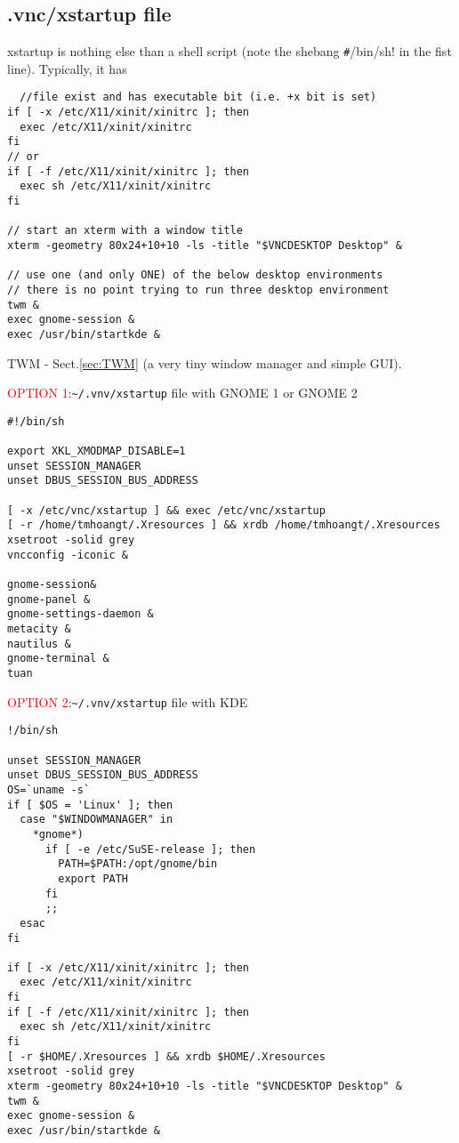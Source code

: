 \subsection{.vnc/xstartup file}
\label{sec:xstartup-vnc}

xstartup is nothing else than a shell script (note the shebang \verb!#!/bin/sh!
in the fist line). Typically, it has
\begin{verbatim} 
  //file exist and has executable bit (i.e. +x bit is set)
if [ -x /etc/X11/xinit/xinitrc ]; then
  exec /etc/X11/xinit/xinitrc
fi
// or 
if [ -f /etc/X11/xinit/xinitrc ]; then
  exec sh /etc/X11/xinit/xinitrc
fi

// start an xterm with a window title
xterm -geometry 80x24+10+10 -ls -title "$VNCDESKTOP Desktop" &

// use one (and only ONE) of the below desktop environments
// there is no point trying to run three desktop environment
twm &   
exec gnome-session &
exec /usr/bin/startkde &
\end{verbatim}
TWM - Sect.\ref{sec:TWM} (a very tiny window manager and simple GUI).

\textcolor{red}{OPTION 1}:\verb!~/.vnv/xstartup!  file with GNOME 1 or GNOME 2
\begin{verbatim}
#!/bin/sh

export XKL_XMODMAP_DISABLE=1
unset SESSION_MANAGER
unset DBUS_SESSION_BUS_ADDRESS

[ -x /etc/vnc/xstartup ] && exec /etc/vnc/xstartup
[ -r /home/tmhoangt/.Xresources ] && xrdb /home/tmhoangt/.Xresources
xsetroot -solid grey
vncconfig -iconic &

gnome-session&
gnome-panel &
gnome-settings-daemon &
metacity &
nautilus &
gnome-terminal &
tuan
\end{verbatim}


\textcolor{red}{OPTION 2}:\verb!~/.vnv/xstartup!  file with KDE
\begin{verbatim}
!/bin/sh

unset SESSION_MANAGER
unset DBUS_SESSION_BUS_ADDRESS
OS=`uname -s`
if [ $OS = 'Linux' ]; then
  case "$WINDOWMANAGER" in
    *gnome*)
      if [ -e /etc/SuSE-release ]; then
        PATH=$PATH:/opt/gnome/bin
        export PATH
      fi
      ;;
  esac
fi

if [ -x /etc/X11/xinit/xinitrc ]; then
  exec /etc/X11/xinit/xinitrc
fi
if [ -f /etc/X11/xinit/xinitrc ]; then
  exec sh /etc/X11/xinit/xinitrc
fi
[ -r $HOME/.Xresources ] && xrdb $HOME/.Xresources
xsetroot -solid grey
xterm -geometry 80x24+10+10 -ls -title "$VNCDESKTOP Desktop" &
twm &   
exec gnome-session &
exec /usr/bin/startkde &
\end{verbatim}


